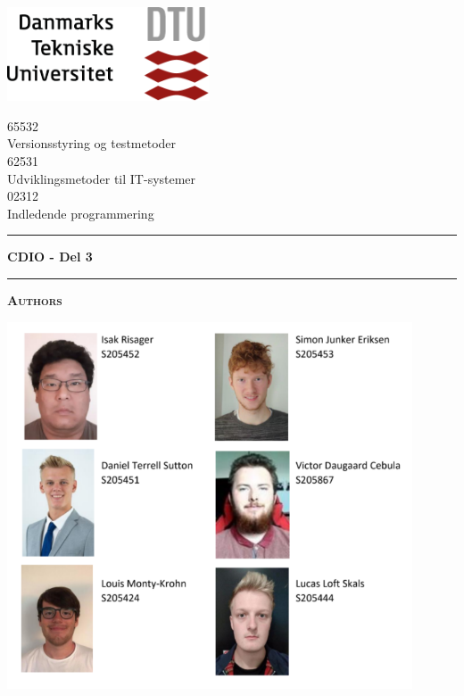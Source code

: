 \begin{titlepage}
\begin{center}
\begin{multicols}{2}
\addtolength{\topmargin}{-.5cm}

\includegraphics[width=0.45\textwidth]{root/dtu.png}~\\
\vspace{.5cm}


65532\\ Versionsstyring og testmetoder \\
\vspace{.2cm}
62531\\ Udviklingsmetoder til IT-systemer \\
\vspace{.2cm}
02312\\ Indledende programmering \\
\end{multicols}{}
\vspace{.5cm}

\hrule
\vspace{.5cm}
{ \huge \bfseries  CDIO - Del 3} %
\vspace{.5cm}

\hrule
\vspace{1cm}

\textsc{\textbf{Authors}}\\

\begin{center}

\includegraphics[width=0.9\textwidth]{Report/ProfilePictures/Forsidebilleder_vert.png}\\


\end{center}
\end{center}
\end{titlepage}
